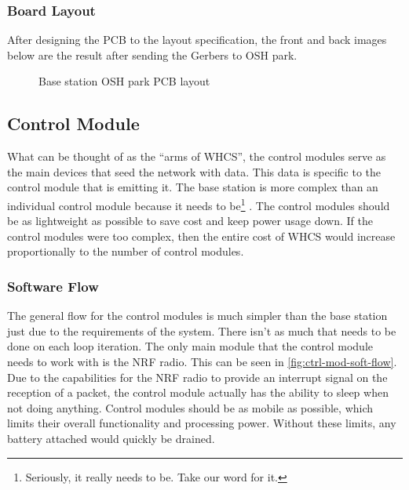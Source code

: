 \subsubsection{Board Layout}
After designing the PCB to the layout specification, the front and back images below are the result after sending the Gerbers to OSH park.

\begin{figure}[H]
\caption{Base station OSH park PCB layout}
\label{fig:base-station-pcb}
\end{figure}


\subsection{Control Module}
What can be thought of as the ``arms of WHCS'', the control modules serve as
the main devices that seed the network with data. This data is specific to the
control module that is emitting it. The base station is more complex than
an individual control module because it needs to be\footnote{Seriously, it really needs to be. Take our word for it.}
. The control modules should
be as lightweight as possible to save cost and keep power usage down. If the
control modules were too complex, then the entire cost of WHCS would increase
proportionally to the number of control modules.

\subsubsection{Software Flow}
The general flow for the control modules is much simpler than the base station
just due to the requirements of the system. There isn't as much that needs to
be done on each loop iteration. The only main module that the control module
needs to work with is the NRF radio. This can be seen in
\autoref{fig:ctrl-mod-soft-flow}. Due to the capabilities
for the NRF radio to provide an interrupt signal on the reception of a packet,
the control module actually has the ability to sleep when not doing anything.
Control modules should be as mobile as possible, which limits their overall
functionality and processing power. Without these limits, any battery attached
would quickly be drained.


